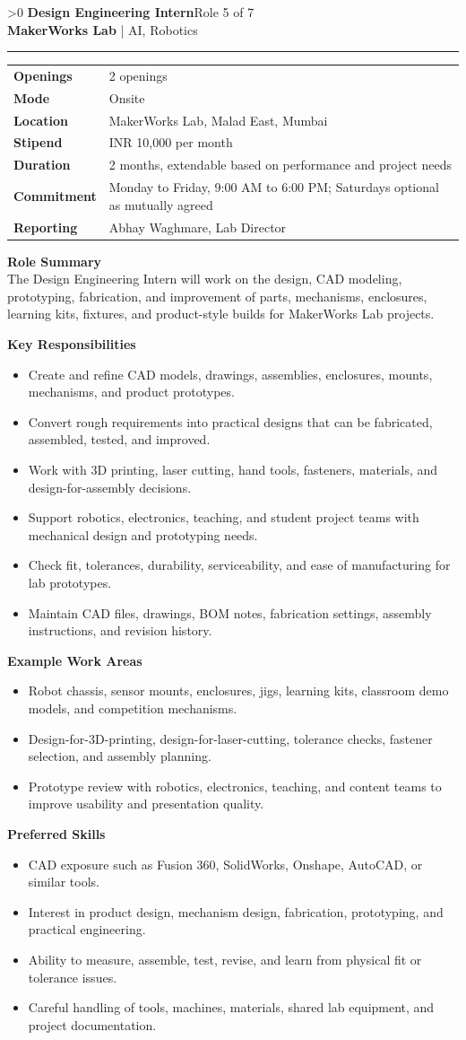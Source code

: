 \documentclass[10pt,a4paper]{article}
\newcommand{\CommonLocation}{MakerWorks Lab, Malad East, Mumbai}
\newcommand{\CommonStipend}{INR 10,000 per month}
\newcommand{\CommonDuration}{2 months, extendable based on performance and project needs}
\newcommand{\CommonCommitment}{Monday to Friday, 9:00 AM to 6:00 PM; Saturdays optional as mutually agreed}
\newcommand{\CommonReporting}{Abhay Waghmare, Lab Director}
\newcounter{rolepage}
\newcommand{\RolePage}[3]{%
  \ifnum\value{rolepage}>0\clearpage\fi
  \stepcounter{rolepage}
  \thispagestyle{plain}
  {\Large\textbf{#1}}\hfill{\small #2}\\
  {\small\textbf{MakerWorks Lab} | AI, Robotics}\\[4pt]
  \hrule
  \vspace{6pt}
  #3
}
\newcommand{\DetailsTable}[3]{%
\begin{tabularx}{\linewidth}{>{\bfseries}p{30mm}X}
Openings & #3 \\
Mode & #1 \\
Location & #2 \\
Stipend & \CommonStipend \\
Duration & \CommonDuration \\
Commitment & \CommonCommitment \\
Reporting & \CommonReporting \\
\end{tabularx}
}
\newcommand{\RoleSection}[1]{\vspace{5pt}\par\noindent\textbf{#1}\par\vspace{2pt}}
\begin{document}
\RolePage{Design Engineering Intern}{Role 5 of 7}{
\DetailsTable{Onsite}{\CommonLocation}{2 openings}

\textbf{Role Summary}\\
The Design Engineering Intern will work on the design, CAD modeling, prototyping, fabrication, and improvement of parts, mechanisms, enclosures, learning kits, fixtures, and product-style builds for MakerWorks Lab projects.

\RoleSection{Key Responsibilities}
\begin{itemize}
  \item Create and refine CAD models, drawings, assemblies, enclosures, mounts, mechanisms, and product prototypes.
  \item Convert rough requirements into practical designs that can be fabricated, assembled, tested, and improved.
  \item Work with 3D printing, laser cutting, hand tools, fasteners, materials, and design-for-assembly decisions.
  \item Support robotics, electronics, teaching, and student project teams with mechanical design and prototyping needs.
  \item Check fit, tolerances, durability, serviceability, and ease of manufacturing for lab prototypes.
  \item Maintain CAD files, drawings, BOM notes, fabrication settings, assembly instructions, and revision history.
\end{itemize}

\RoleSection{Example Work Areas}
\begin{itemize}
  \item Robot chassis, sensor mounts, enclosures, jigs, learning kits, classroom demo models, and competition mechanisms.
  \item Design-for-3D-printing, design-for-laser-cutting, tolerance checks, fastener selection, and assembly planning.
  \item Prototype review with robotics, electronics, teaching, and content teams to improve usability and presentation quality.
\end{itemize}

\RoleSection{Preferred Skills}
\begin{itemize}
  \item CAD exposure such as Fusion 360, SolidWorks, Onshape, AutoCAD, or similar tools.
  \item Interest in product design, mechanism design, fabrication, prototyping, and practical engineering.
  \item Ability to measure, assemble, test, revise, and learn from physical fit or tolerance issues.
  \item Careful handling of tools, machines, materials, shared lab equipment, and project documentation.
\end{itemize}

}
\end{document}
